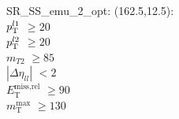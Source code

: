 SR\_SS\_emu\_2\_opt: (162.5,12.5): \\
$p_{\text{T}}^{l1}$ $\geq 20$ \\
$p_{\text{T}}^{l2}$ $\geq 20$ \\
$m_{T2}$ $\geq 85$ \\
$|\Delta\eta_{ll}|$ $<2$ \\
$E_{\text{T}}^{\text{miss,rel}}$ $\geq 90$ \\
$m_{\text{T}}^{\text{max}}$ $\geq 130$ \\

